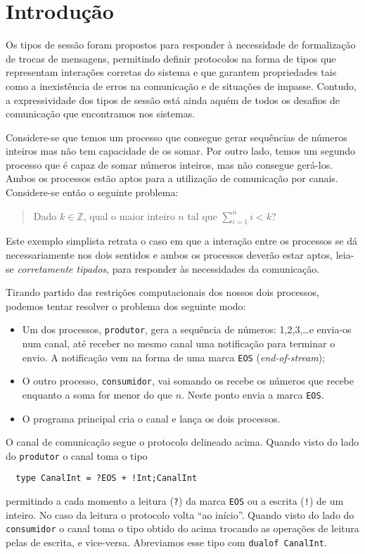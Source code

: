 \section{Introdução}

Os tipos de sessão foram propostos para responder à necessidade
de formalização de trocas de mensagens, permitindo definir protocolos 
na forma de tipos que representam interações corretas do sistema e que 
garantem propriedades tais como a inexistência de erros na comunicação 
e de situações de impasse. Contudo, a expressividade dos tipos de sessão
está ainda aquém de todos os desafios de comunicação que encontramos nos 
sistemas.

Considere-se que temos um processo que consegue gerar sequências de números
inteiros mas não tem capacidade de os somar. Por outro lado, temos um
segundo processo que é capaz de somar números inteiros, mas não consegue
gerá-los. Ambos os processos estão aptos para a utilização de comunicação
por canais. Considere-se então o seguinte problema:

\begin{quote}
	Dado $k\in\mathbb{Z}$, qual o maior inteiro $n$ tal que
	$\sum_{i=1}^n i < k$?
\end{quote}

Este exemplo simplista retrata o caso em que a interação entre
os processos se dá necessariamente nos dois sentidos e ambos 
os processos deverão
estar aptos, leia-se \emph{corretamente tipados}, para responder 
às necessidades da comunicação.

Tirando partido das restrições computacionais dos nossos dois
processos, podemos tentar resolver o problema dos seguinte modo:
%
\begin{itemize}
\item Um dos processos, \lstinline|produtor|, gera a sequência de
  números: 1,2,3,\dots e envia-os num canal, até receber no mesmo
  canal uma notificação para terminar o envio. A notificação vem na
  forma de uma marca \lstinline|EOS| (\textit{end-of-stream});
\item O outro processo, \lstinline|consumidor|, vai somando os recebe
  os números que recebe enquanto a soma for menor do que $n$. Neste
  ponto envia a marca \lstinline|EOS|.
\item O programa principal cria o canal e lança os dois processos.
\end{itemize}

O canal de comunicação segue o  protocolo delineado acima. Quando
visto do lado do \lstinline|produtor| o canal toma o tipo
%
\begin{lstlisting}
  type CanalInt = ?EOS + !Int;CanalInt
\end{lstlisting}
%
permitindo a cada momento a leitura (\lstinline|?|) da marca
\lstinline|EOS| ou a escrita (\lstinline|!|) de um inteiro. No caso da
leitura o protocolo volta ``ao início''.
%
Quando visto do lado do \lstinline|consumidor| o canal toma o tipo
obtido do acima trocando as operações de leitura pelas de escrita, e
vice-versa. Abreviamos esse tipo com \lstinline|dualof CanalInt|.

